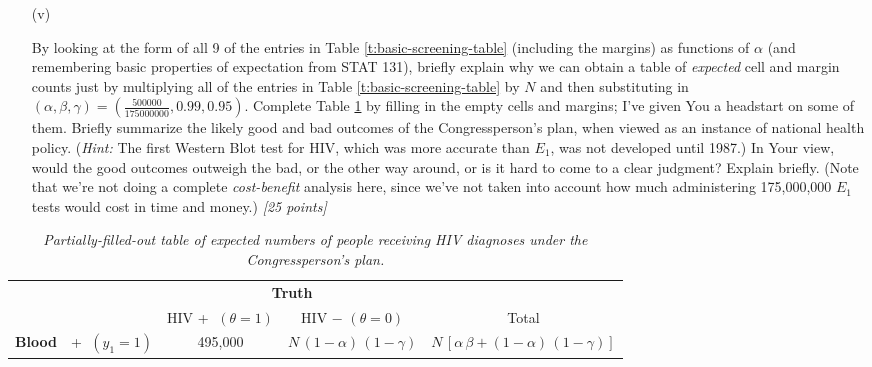 \documentclass[12pt]{article}
\begin{document}
\begin{itemize}
\begin{itemize}

\item[(v)] 

By looking at the form of all 9 of the entries in Table \ref{t:basic-screening-table} (including the margins) as functions of $\alpha$ (and remembering basic properties of expectation from STAT 131), briefly explain why we can obtain a table of \textit{expected} cell and margin counts just by multiplying all of the entries in Table \ref{t:basic-screening-table} by $N$ and then substituting in $( \alpha, \beta, \gamma ) = \left( \frac{ 500000 }{ 175000000 }, 0.99, 0.95 \right)$. Complete Table \ref{t:congressperson-table} by filling in the empty cells and margins; I've given You a headstart on some of them. Briefly summarize the likely good and bad outcomes of the Congressperson's plan, when viewed as an instance of national health policy. (\textit{Hint:} The first Western Blot test for HIV, which was more accurate than $E_1$, was not developed until 1987.) In Your view, would the good outcomes outweigh the bad, or the other way around, or is it hard to come to a clear judgment? Explain briefly. (Note that we're not doing a complete \textit{cost-benefit} analysis here, since we've not taken into account how much administering 175,000,000 $E_1$ tests would cost in time and money.) \textit{[25 points]}

\end{itemize}

\begin{table}[t!]

\centering

\caption{\textit{Partially-filled-out table of expected numbers of people receiving HIV diagnoses under the Congressperson's plan.}}

\label{t:congressperson-table}

\bigskip

\begin{tabular}{cc|c|c|c}

& \multicolumn{1}{c}{} & \multicolumn{2}{c}{\textbf{Truth}} \\

& \multicolumn{1}{c}{} & \multicolumn{1}{c}{HIV \textcircled{+} $( \theta = 1 )$} & \multicolumn{1}{c}{HIV \textcircled{$-$} $( \theta = 0 )$}  & Total \\ \cline{3-4}

\textbf{Blood} & \textcircled{+} $( y_1 = 1 )$ & 495,000 & $N \, ( 1 - \alpha ) \, ( 1 - \gamma )$ & $N \, [ \alpha \, \beta + ( 1 - \alpha ) \, ( 1 - \gamma ) ]$ \\ \cline{3-4}


\end{tabular}
\end{table}
\end{itemize}
\end{document}
